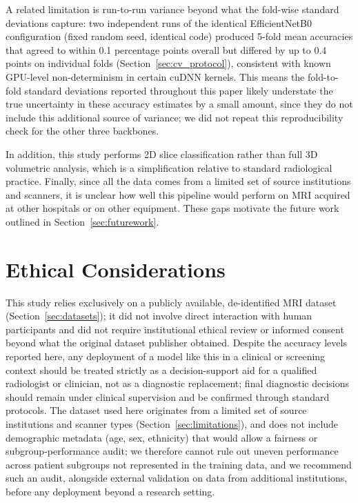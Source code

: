 \documentclass[11pt]{article}
\begin{document}
A related limitation is run-to-run variance beyond what the fold-wise standard deviations capture: two independent runs of the identical EfficientNetB0 configuration (fixed random seed, identical code) produced 5-fold mean accuracies that agreed to within 0.1 percentage points overall but differed by up to 0.4 points on individual folds (Section~\ref{sec:cv_protocol}), consistent with known GPU-level non-determinism in certain cuDNN kernels. This means the fold-to-fold standard deviations reported throughout this paper likely understate the true uncertainty in these accuracy estimates by a small amount, since they do not include this additional source of variance; we did not repeat this reproducibility check for the other three backbones.

In addition, this study performs 2D slice classification rather than full 3D volumetric analysis, which is a simplification relative to standard radiological practice. Finally, since all the data comes from a limited set of source institutions and scanners, it is unclear how well this pipeline would perform on MRI acquired at other hospitals or on other equipment. These gaps motivate the future work outlined in Section~\ref{sec:futurework}.


\section{Ethical Considerations}
\label{sec:ethics}
This study relies exclusively on a publicly available, de-identified MRI dataset (Section~\ref{sec:datasets}); it did not involve direct interaction with human participants and did not require institutional ethical review or informed consent beyond what the original dataset publisher obtained. Despite the accuracy levels reported here, any deployment of a model like this in a clinical or screening context should be treated strictly as a decision-support aid for a qualified radiologist or clinician, not as a diagnostic replacement; final diagnostic decisions should remain under clinical supervision and be confirmed through standard protocols. The dataset used here originates from a limited set of source institutions and scanner types (Section~\ref{sec:limitations}), and does not include demographic metadata (age, sex, ethnicity) that would allow a fairness or subgroup-performance audit; we therefore cannot rule out uneven performance across patient subgroups not represented in the training data, and we recommend such an audit, alongside external validation on data from additional institutions, before any deployment beyond a research setting.
\end{document}
